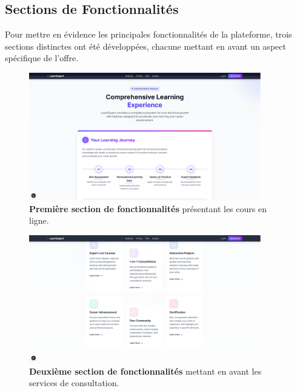 \subsection{Sections de Fonctionnalités}
Pour mettre en évidence les principales fonctionnalités de la plateforme, trois sections distinctes ont été développées, chacune mettant en avant un aspect spécifique de l'offre.

\begin{figure}[h!]
  \centering
  \includegraphics[width=0.9\textwidth,keepaspectratio]{week_2_img/featchersection_1.png}
  \caption{\textbf{Première section de fonctionnalités} présentant les cours en ligne.}
  \label{fig:features_section_1}
\end{figure}

\begin{figure}[h!]
  \centering
  \includegraphics[width=0.9\textwidth,keepaspectratio]{week_2_img/fetchersection_2.png}
  \caption{\textbf{Deuxième section de fonctionnalités} mettant en avant les services de consultation.}
  \label{fig:features_section_2}
\end{figure}

